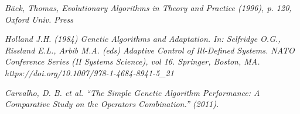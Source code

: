 \documentclass[openany]{article}
\begin{document}
		
		
		
\begin{thebibliography}{1}	
	\textit{Bäck, Thomas, Evolutionary Algorithms in Theory and Practice (1996), p. 120, Oxford Univ. Press}
	
	\textit{Holland J.H. (1984) Genetic Algorithms and Adaptation. In: Selfridge O.G., Rissland E.L., Arbib M.A. (eds) Adaptive Control of Ill-Defined Systems. NATO Conference Series (II Systems Science), vol 16. Springer, Boston, MA. https://doi.org/10.1007/978-1-4684-8941-5\_21}
	
	\textit{Carvalho, D. B. et al. “The Simple Genetic Algorithm Performance: A Comparative Study on the Operators Combination.” (2011).}
	
\end{thebibliography}
			
\end{document}
